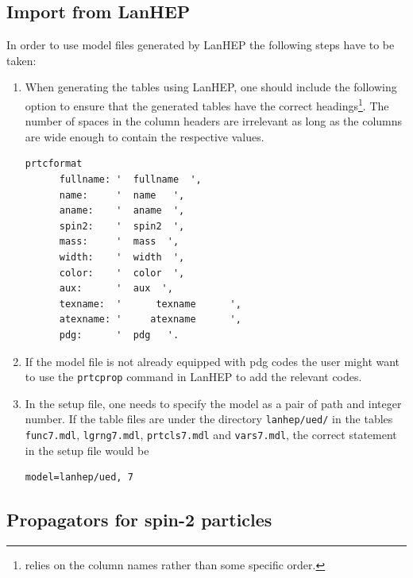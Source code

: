 \subsection{Import from LanHEP}
In order to use model files generated by LanHEP the following steps
have to be taken:
\begin{enumerate}
\item When generating the tables using LanHEP, one should include the
   following option to ensure that the generated tables have the correct
   headings\footnote{\gosamv{} relies on the column names rather than
   some specific order.}. The number of spaces in the column headers are
   irrelevant as long as the columns are wide enough to contain the
   respective values.
\begin{lstlisting}[style=in]
   prtcformat
      fullname: '  fullname  ',
      name:     '  name   ',
      aname:    '  aname  ',
      spin2:    '  spin2  ',
      mass:     '  mass  ',
      width:    '  width  ',
      color:    '  color  ',
      aux:      '  aux  ',
      texname:  '      texname      ',
      atexname: '     atexname      ',
      pdg:      '  pdg   '.
\end{lstlisting}
\item If the model file is not already equipped with pdg codes
   the user might want to use the \verb!prtcprop! command in
   LanHEP to add the relevant codes.
\item In the setup file, one needs to specify the model as a pair
   of path and integer number. If the table files are under the directory
   \texttt{lanhep/ued/} in the tables \texttt{func7.mdl}, \texttt{lgrng7.mdl},
   \texttt{prtcls7.mdl} and \texttt{vars7.mdl}, the correct statement in
   the setup file would be
\begin{lstlisting}[style=in]
   model=lanhep/ued, 7
\end{lstlisting}
\end{enumerate}



\subsection{Propagators for spin-2 particles}
\label{sec:spin2}

